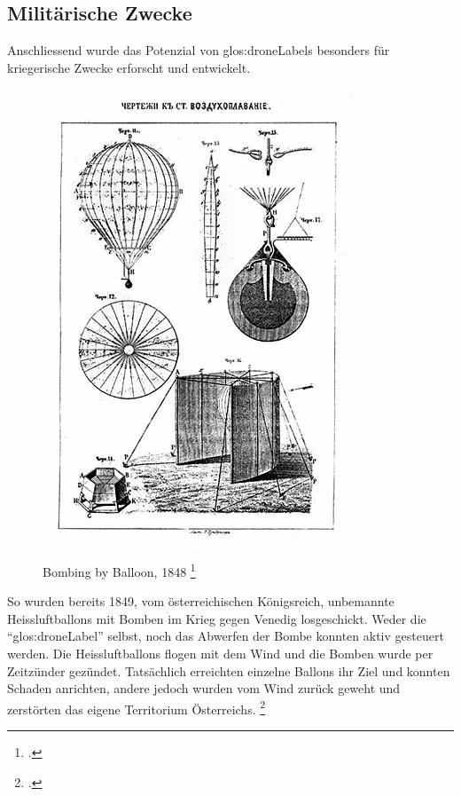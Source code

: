 \subsection{Militärische Zwecke}
Anschliessend wurde das Potenzial von \glspl{glos:droneLabel} besonders für kriegerische Zwecke erforscht und entwickelt.

\begin{figure}
	\includegraphics[width=1.0\linewidth]{images/analysis/balloonbombs1849.jpg}
	\caption[Bombing by Balloon, 1848]{Bombing by Balloon, 1848 \protect\footcite{Remote_Piloted_Aerial_Vehicles_2015-03-21}}
\end{figure}

So wurden bereits 1849, vom österreichischen Königsreich, unbemannte Heissluftballons mit Bomben im Krieg gegen Venedig losgeschickt.
Weder die "`\gls{glos:droneLabel}"' selbst, noch das Abwerfen der Bombe konnten aktiv gesteuert werden.
Die Heissluftballons flogen mit dem Wind und die Bomben wurde per Zeitzünder gezündet. Tatsächlich erreichten einzelne Ballons ihr Ziel und konnten Schaden anrichten, andere jedoch wurden vom Wind zurück geweht und zerstörten das eigene Territorium Österreichs. \footcite{Remote_Piloted_Aerial_Vehicles_2015-03-21}











